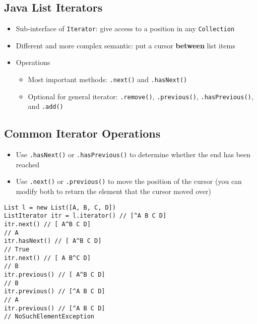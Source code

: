 \documentclass[10pt]{article}
\begin{document}
\subsection*{Java List Iterators}
\begin{itemize}
    \item Sub-interface of \texttt{Iterator}: give access to a position in any \texttt{Collection}
    \item Different and more complex semantic: put a cursor \textbf{between} list items
    \item Operations
    \begin{itemize}
        \item Most important methods: \texttt{.next()} and \texttt{.hasNext()}
        \item Optional for general iterator: \texttt{.remove()}, \texttt{.previous()}, \texttt{.hasPrevious()}, and \texttt{.add()}
    \end{itemize}
\end{itemize}

\subsection*{Common Iterator Operations}
\begin{itemize}
    \item Use \texttt{.hasNext()} or \texttt{.hasPrevious()} to determine whether the end has been reached
    \item Use \texttt{.next()} or \texttt{.previous()} to move the position of the cursor (you can modify both to return the element that the cursor moved over)
    \end{itemize}
\begin{verbatim}
List l = new List([A, B, C, D]) 
ListIterator itr = l.iterator() // [^A B C D]
itr.next() // [ A^B C D]
// A
itr.hasNext() // [ A^B C D]
// True
itr.next() // [ A B^C D]
// B
itr.previous() // [ A^B C D]
// B
itr.previous() // [^A B C D]
// A
itr.previous() // [^A B C D]
// NoSuchElementException
\end{verbatim}
\end{document}
